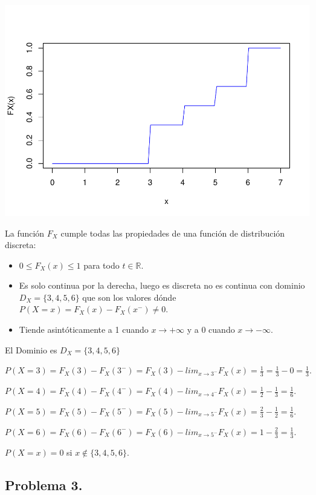 \documentclass[
]{article}
\providecommand{\tightlist}{%
  \setlength{\itemsep}{0pt}\setlength{\parskip}{0pt}}
\begin{document}
\includegraphics{Tema-2---Variables-Aleatorias_Soluciones_v1_0_files/figure-latex/unnamed-chunk-2-1.pdf}

La función \(F_X\) cumple todas las propiedades de una función de
distribución discreta:

\begin{itemize}
\tightlist
\item
  \(0\leq F_X(x)\leq 1\) para todo \(t\in \mathbb{R}.\)
\item
  Es solo continua por la derecha, luego es discreta no es continua con
  dominio \(D_X=\{3,4,5,6\}\) que son los valores dónde
  \(P(X=x)=F_X(x)-F_X(x^{-})\not=0\).
\item
  Tiende asintóticamente a 1 cuando \(x\to+\infty\) y a 0 cuando
  \(x\to-\infty\).
\end{itemize}

El Dominio es \(D_X=\{3,4,5,6\}\)

\(P(X=3)=F_X(3)-F_X(3^{-})=F_X(3)-lim_{x\to 3^{-}} F_X(x)=\frac{1}{3}=\frac{1}{3}-0=\frac{1}{3}.\)

\(P(X=4)=F_X(4)-F_X(4^{-})=F_X(4)-lim_{x\to 4^{-}} F_X(x)=\frac{1}{2}-\frac{1}{3}=\frac{1}{6}.\)

\(P(X=5)=F_X(5)-F_X(5^{-})=F_X(5)-lim_{x\to 5^{-}} F_X(x)=\frac{2}{3}-\frac{1}{2}=\frac{1}{6}.\)

\(P(X=6)=F_X(6)-F_X(6^{-})=F_X(6)-lim_{x\to 5^{-}} F_X(x)=1-\frac{2}{3}=\frac{1}{3}.\)

\(P(X=x)=0\) si \(x \not\in\{3,4,5,6\}.\)

\subsection{Problema 3.}\label{problema-3.}
\end{document}
